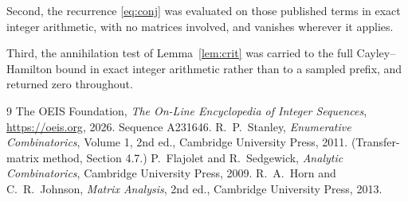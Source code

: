 \documentclass[11pt,a4paper]{article}
\theoremstyle{plain}
\theoremstyle{definition}
\begin{document}
Second, the recurrence \eqref{eq:conj} was evaluated on those published terms in exact
integer arithmetic, with no matrices involved, and vanishes wherever it applies.

Third, the annihilation test of Lemma~\ref{lem:crit} was carried to the full
Cayley--Hamilton bound in exact integer arithmetic rather than to a sampled prefix, and
returned zero throughout.

\begin{thebibliography}{9}
 The OEIS Foundation, \emph{The On-Line Encyclopedia of Integer
Sequences}, \url{https://oeis.org}, 2026. Sequence A231646.
 R.~P.~Stanley, \emph{Enumerative Combinatorics}, Volume 1, 2nd ed.,
Cambridge University Press, 2011. (Transfer-matrix method, Section 4.7.)
 P.~Flajolet and R.~Sedgewick, \emph{Analytic Combinatorics}, Cambridge
University Press, 2009.
 R.~A.~Horn and C.~R.~Johnson, \emph{Matrix Analysis}, 2nd ed., Cambridge
University Press, 2013.
\end{thebibliography}
\end{document}
